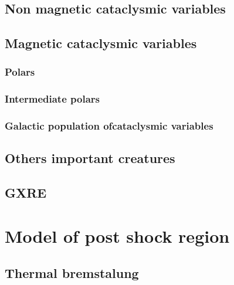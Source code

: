 \documentclass[oneside,a4paper,11pt]{report}
\begin{document}
\section{Non magnetic cataclysmic variables} 
\section{Magnetic cataclysmic variables}
\subsection{Polars}
\subsection{Intermediate polars}
\subsection{Galactic population ofcataclysmic variables }
\section{Others important creatures}
\section{GXRE}



\chapter{Model of post shock region}
\section{Thermal bremstalung}
\end{document}
